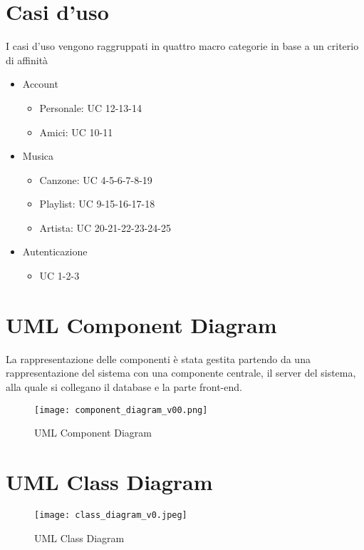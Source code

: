 \section{Casi d'uso}
I casi d'uso vengono raggruppati in quattro macro categorie in base a un criterio di affinità
\begin{itemize}
    \item Account
    \begin{itemize}
        \item Personale: UC 12-13-14
        \item Amici: UC 10-11
    \end{itemize}
    \item Musica
    \begin{itemize}
        \item Canzone: UC 4-5-6-7-8-19
        \item Playlist: UC 9-15-16-17-18
        \item Artista: UC 20-21-22-23-24-25
    \end{itemize}
    \item Autenticazione
    \begin{itemize}
        \item UC 1-2-3
    \end{itemize}
\end{itemize}




\newpage
\section{UML Component Diagram}
La rappresentazione delle componenti è stata gestita partendo da una rappresentazione del sistema 
con una componente centrale, il server del sistema, alla quale si collegano il database e la parte front-end.


\begin{figure}[H]
    \centering
    \texttt{[image: component\_diagram\_v00.png]}
    \caption{UML Component Diagram}
    \label{fig-uml-component-diag}
\end{figure}



\newpage
\section{UML Class Diagram}
\begin{figure}[H]
    \centering
    \texttt{[image: class\_diagram\_v0.jpeg]}
    \caption{UML Class Diagram}
    \label{fig-uml-class-diag}
\end{figure}

